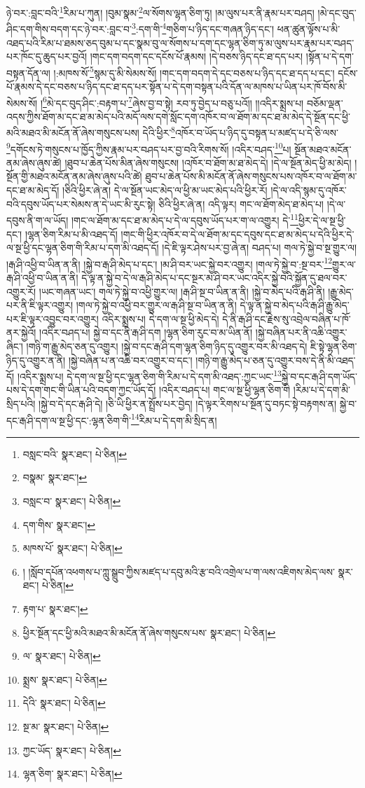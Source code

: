 ཉེ་བར་:བླང་བའི་\footnote{བསླང་བའི་  སྣར་ཐང་།  པེ་ཅིན། }རིམ་པ་ཀུན། །བུམ་སྣམ་\footnote{བསྣམ་  སྣར་ཐང་། }ལ་སོགས་ལྷན་ཅིག་ཏུ། །མ་ལུས་པར་ནི་རྣམ་པར་བཤད། །མེ་དང་བུད་ཤིང་དག་གིས་བདག་དང་ཉེ་བར་:བླང་བ་\footnote{བསླང་བ་  སྣར་ཐང་།  པེ་ཅིན། }:དག་གི་\footnote{དག་གིས་  སྣར་ཐང་། }གཅིག་པ་ཉིད་དང་གཞན་ཉིད་དང་། ཕན་ཚུན་ལྟོས་པ་མི་འཐད་པའི་རིམ་པ་ཐམས་ཅད་བུམ་པ་དང་སྣམ་བུ་ལ་སོགས་པ་དག་དང་ལྷན་ཅིག་ཏུ་མ་ལུས་པར་རྣམ་པར་བཤད་པར་ཁོང་དུ་ཆུད་པར་བྱའོ། །གང་དག་བདག་དང་དངོས་པོ་རྣམས། །དེ་བཅས་ཉིད་དང་ཐ་དད་པར། །སྟོན་པ་དེ་དག་བསྟན་དོན་ལ། །:མཁས་སོ་\footnote{མཁས་པོ་  སྣར་ཐང་།  པེ་ཅིན། }སྙམ་དུ་མི་སེམས་སོ། །གང་དག་བདག་དེ་དང་བཅས་པ་ཉིད་དང་ཐ་དད་པ་དང་། དངོས་པོ་རྣམས་དེ་དང་བཅས་པ་ཉིད་དང་ཐ་དད་པར་སྟོན་པ་དེ་དག་བསྟན་པའི་དོན་ལ་མཁས་པ་ཡིན་པར་ཁོ་བོས་མི་སེམས་སོ། །\footnote{། །སློབ་དཔོན་འཕགས་པ་ཀླུ་སྒྲུབ་ཀྱིས་མཛད་པ་དབུ་མའི་རྩ་བའི་འགྲེལ་པ་ག་ལས་འཇིགས་མེད་ལས་  སྣར་ཐང་།  པེ་ཅིན། }མེ་དང་བུད་ཤིང་:བརྟག་པ་\footnote{རྟག་པ་  སྣར་ཐང་། }ཞེས་བྱ་བ་སྟེ། རབ་ཏུ་བྱེད་པ་བཅུ་པའོ།། །།འདིར་སྨྲས་པ། བཅོམ་ལྡན་འདས་ཀྱིས་ཐོག་མ་དང་ཐ་མ་མེད་པའི་མདོ་ལས་དགེ་སློང་དག་འཁོར་བ་ལ་ཐོག་མ་དང་ཐ་མ་མེད་དེ་སྔོན་དང་ཕྱི་མའི་མཐའ་མི་མངོན་ནོ་ཞེས་གསུངས་པས། དེའི་ཕྱིར་\footnote{ཕྱིར་སྔོན་དང་ཕྱི་མའི་མཐའ་མི་མངོན་ནོ་ཞེས་གསུངས་པས་  སྣར་ཐང་།  པེ་ཅིན། }འཁོར་བ་ཡོད་པ་ཉིད་དུ་བསྟན་པ་མཛད་པ་དེ་ཅི་ལས་\footnote{ལ་  སྣར་ཐང་།  པེ་ཅིན། }དགོངས་ཏེ་གསུངས་པ་ཁྱོད་ཀྱིས་རྣམ་པར་བཤད་པར་བྱ་བའི་རིགས་སོ། །འདིར་བཤད་\footnote{སྨྲས་  སྣར་ཐང་།  པེ་ཅིན། }པ། སྔོན་མཐའ་མངོན་ནམ་ཞེས་ཞུས་ཚེ། །ཐུབ་པ་ཆེན་པོས་མིན་ཞེས་གསུངས། །འཁོར་བ་ཐོག་མ་ཐ་མེད་དེ། །དེ་ལ་སྔོན་མེད་ཕྱི་མ་མེད། །སྔོན་གྱི་མཐའ་མངོན་ནམ་ཞེས་ཞུས་པའི་ཚེ། ཐུབ་པ་ཆེན་པོས་མི་མངོན་ནོ་ཞེས་གསུངས་པས་འཁོར་བ་ལ་ཐོག་མ་དང་ཐ་མ་མེད་དོ། །ཅིའི་ཕྱིར་ཞེ་ན། དེ་ལ་སྔོན་ཡང་མེད་ལ་ཕྱི་མ་ཡང་མེད་པའི་ཕྱིར་རོ། །དེ་ལ་འདི་སྙམ་དུ་འཁོར་བའི་དབུས་ཡོད་པར་སེམས་ན་དེ་ཡང་མི་རུང་སྟེ། ཅིའི་ཕྱིར་ཞེ་ན། འདི་ལྟར། གང་ལ་ཐོག་མེད་ཐ་མེད་པ། །དེ་ལ་དབུས་ནི་ག་ལ་ཡོད། །གང་ལ་ཐོག་མ་དང་ཐ་མ་མེད་པ་དེ་ལ་དབུས་ཡོད་པར་ག་ལ་འགྱུར། དེ་\footnote{དེའི་  སྣར་ཐང་།  པེ་ཅིན། }ཕྱིར་དེ་ལ་སྔ་ཕྱི་དང་། །ལྷན་ཅིག་རིམ་པ་མི་འཐད་དོ། །གང་གི་ཕྱིར་འཁོར་བ་དེ་ལ་ཐོག་མ་དང་དབུས་དང་ཐ་མ་མེད་པ་དེའི་ཕྱིར་དེ་ལ་སྔ་ཕྱི་དང་ལྷན་ཅིག་གི་རིམ་པ་དག་མི་འཐད་དོ། །དེ་ཇི་ལྟར་ཤེས་པར་བྱ་ཞེ་ན། བཤད་པ། གལ་ཏེ་སྐྱེ་བ་སྔ་གྱུར་ལ། །རྒ་ཤི་འཕྱི་བ་ཡིན་ན་ནི། །སྐྱེ་བ་རྒ་ཤི་མེད་པ་དང་། །མ་ཤི་བར་ཡང་སྐྱེ་བར་འགྱུར། །གལ་ཏེ་སྐྱེ་བ་:སྔ་བར་\footnote{སྔ་མ་  སྣར་ཐང་།  པེ་ཅིན། }གྱུར་ལ་རྒ་ཤི་འཕྱི་བ་ཡིན་ན་ནི། དེ་ལྟ་ན་སྐྱེ་བ་དེ་ལ་རྒ་ཤི་མེད་པ་དང་སྔར་མ་ཤི་བར་ཡང་འདིར་སྐྱེ་བའི་སྐྱོན་དུ་ཐལ་བར་འགྱུར་རོ། །ཡང་གཞན་ཡང་། གལ་ཏེ་སྐྱེ་བ་འཕྱི་གྱུར་ལ། །རྒ་ཤི་སྔ་བ་ཡིན་ན་ནི། །སྐྱེ་བ་མེད་པའི་རྒ་ཤི་ནི། །རྒྱུ་མེད་པར་ནི་ཇི་ལྟར་འགྱུར། །གལ་ཏེ་སྐྱེ་བ་འཕྱི་བར་གྱུར་ལ་རྒ་ཤི་སྔ་བ་ཡིན་ན་ནི། དེ་ལྟ་ན་སྐྱེ་བ་མེད་པའི་རྒ་ཤི་རྒྱུ་མེད་པར་ཇི་ལྟར་འབྱུང་བར་འགྱུར། འདིར་སྨྲས་པ། དེ་དག་ལ་སྔ་ཕྱི་མེད་དེ། དེ་ནི་རྒ་ཤི་དང་རྗེས་སུ་འབྲེལ་བཞིན་པ་ཁོ་ནར་སྐྱེའོ། །འདིར་བཤད་པ། སྐྱེ་བ་དང་ནི་རྒ་ཤི་དག །ལྷན་ཅིག་རུང་བ་མ་ཡིན་ནོ། །སྐྱེ་བཞིན་པར་ནི་འཆི་འགྱུར་ཞིང་། །གཉི་ག་རྒྱུ་མེད་ཅན་དུ་འགྱུར། །སྐྱེ་བ་དང་རྒ་ཤི་དག་ལྷན་ཅིག་ཉིད་དུ་འགྱུར་བར་མི་འཐད་དེ། ཇི་སྟེ་ལྷན་ཅིག་ཉིད་དུ་འགྱུར་ན་ནི། །སྐྱེ་བཞིན་པ་ན་འཆི་བར་འགྱུར་བ་དང་། །གཉི་ག་རྒྱུ་མེད་པ་ཅན་དུ་འགྱུར་བས་དེ་ནི་མི་འཐད་དོ། །འདིར་སྨྲས་པ། དེ་དག་ལ་སྔ་ཕྱི་དང་ལྷན་ཅིག་གི་རིམ་པ་དེ་དག་མི་འཐད་:ཀྱང་ཡང་\footnote{ཀྱང་ཡོད་  སྣར་ཐང་།  པེ་ཅིན། }སྐྱེ་བ་དང་རྒ་ཤི་དག་ཡོད་པས་དེ་དག་གང་གི་ཡིན་པའི་བདག་ཀྱང་ཡོད་དོ། །འདིར་བཤད་པ། གང་ལ་སྔ་ཕྱི་ལྷན་ཅིག་གི །རིམ་པ་དེ་དག་མི་སྲིད་པའི། །སྐྱེ་བ་དེ་དང་རྒ་ཤི་དེ། །ཅི་ཡི་ཕྱིར་ན་སྤྲོས་པར་བྱེད། །དེ་ལྟར་རིགས་པ་སྔོན་དུ་བཏང་སྟེ་བརྟགས་ན། སྐྱེ་བ་དང་རྒ་ཤི་དག་ལ་སྔ་ཕྱི་དང་:ལྷན་ཅིག་གི་\footnote{ལྷན་ཅིག་  སྣར་ཐང་།  པེ་ཅིན། }རིམ་པ་དེ་དག་མི་སྲིད་ན། 